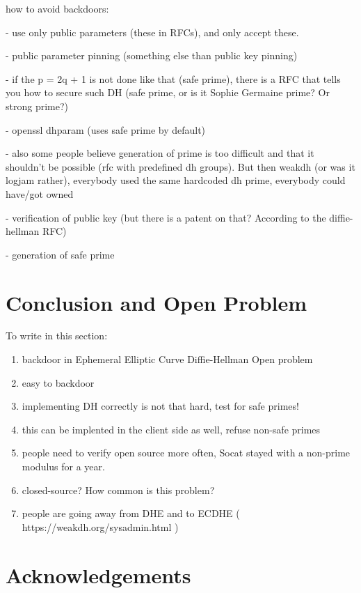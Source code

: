 \documentclass[a4paper,11pt,twocolumn]{article}
\begin{document}
how to avoid backdoors:

- use only public parameters (these in RFCs), and only accept these. 

- public parameter pinning (something else than public key pinning)

- if the p = 2q + 1 is not done like that (safe prime), there is a RFC that tells you how to secure such DH (safe prime, or is it Sophie Germaine prime? Or strong prime?)

- openssl dhparam (uses safe prime by default)

- also some people believe generation of prime is too difficult and that it shouldn't be possible (rfc with predefined dh groups). But then weakdh (or was it logjam rather), everybody used the same hardcoded dh prime, everybody could have/got owned

- verification of public key (but there is a patent on that? According to the diffie-hellman RFC)

- generation of safe prime


\section{Conclusion and Open Problem}

To write in this section:

\begin{enumerate}
\item backdoor in Ephemeral Elliptic Curve Diffie-Hellman Open problem
\item easy to backdoor
\item  implementing DH correctly is not that hard, test for safe primes!
\item  this can be implented in the client side as well, refuse non-safe primes
\item  people need to verify open source more often, Socat stayed with a non-prime modulus for a year.
\item  closed-source? How common is this problem?
\item  people are going away from DHE and to ECDHE ( https://weakdh.org/sysadmin.html )
\end{enumerate}

\newpage
\newpage

\section*{Acknowledgements}
\end{document}

